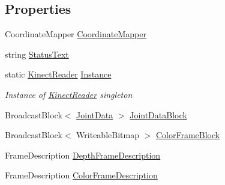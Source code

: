 \subsection*{Properties}
\begin{DoxyCompactItemize}
\item 
Coordinate\+Mapper \hyperlink{class_rowing_monitor_1_1_model_1_1_pipeline_1_1_kinect_reader_abb848deb4ea9ed2ed53f6d95ce1945db}{Coordinate\+Mapper}
\item 
string \hyperlink{class_rowing_monitor_1_1_model_1_1_pipeline_1_1_kinect_reader_a75073cd905041d0675f11e6ac23836bf}{Status\+Text}
\item 
static \hyperlink{class_rowing_monitor_1_1_model_1_1_pipeline_1_1_kinect_reader}{Kinect\+Reader} \hyperlink{class_rowing_monitor_1_1_model_1_1_pipeline_1_1_kinect_reader_ae0ef04719102355582b9c41b5affed8c}{Instance}
\begin{DoxyCompactList}\small\item\em Instance of \hyperlink{class_rowing_monitor_1_1_model_1_1_pipeline_1_1_kinect_reader}{Kinect\+Reader} singleton \end{DoxyCompactList}\item 
Broadcast\+Block$<$ \hyperlink{struct_rowing_monitor_1_1_model_1_1_util_1_1_joint_data}{Joint\+Data} $>$ \hyperlink{class_rowing_monitor_1_1_model_1_1_pipeline_1_1_kinect_reader_a6e860c115b12d8f17b8f800f9bc64645}{Joint\+Data\+Block}
\item 
Broadcast\+Block$<$ Writeable\+Bitmap $>$ \hyperlink{class_rowing_monitor_1_1_model_1_1_pipeline_1_1_kinect_reader_acfc75a10c6a18c1a8f511944cb411937}{Color\+Frame\+Block}
\item 
Frame\+Description \hyperlink{class_rowing_monitor_1_1_model_1_1_pipeline_1_1_kinect_reader_a8aafd70dd48e36b6cc55ad2bee4ae0e6}{Depth\+Frame\+Description}
\item 
Frame\+Description \hyperlink{class_rowing_monitor_1_1_model_1_1_pipeline_1_1_kinect_reader_a43790d6bdb5e70d50c418fb17ac90ee6}{Color\+Frame\+Description}
\end{DoxyCompactItemize}
